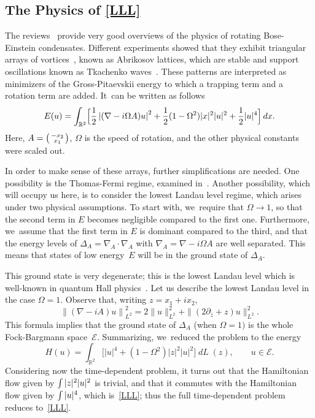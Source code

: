 \documentclass[10pt]{amsart}
\newenvironment{smallpmatrix}{\bigl(\begin{smallmatrix}}{\end{smallmatrix}\bigr)}
\DeclareMathOperator{\dL}{\mathit{dL}}
\theoremstyle{definition}
\let\dis\relax
\begin{document}
\subsection{The Physics of \eqref{LLL}}

The reviews~\cite{Aftalion,Fetter} provide very good overviews of the physics of rotating Bose-Einstein condensates.
Different experiments showed that they exhibit triangular arrays of vortices~\cite{ARVK,MCWD,SCEMC}, known as Abrikosov lattices, which are stable and support oscillations known as Tkachenko waves~\cite{BWCB}. These patterns are interpreted as minimizers of the Gross-Pitaevskii energy to which a trapping term and a rotation term are added. It~can be written as follows\vspace*{-1pt}\enlargethispage{3pt}
\[
E(u) = \int_{\mathbb{R}^2} \Bigl[ \frac{1}{2} \left| (\nabla - i \Omega A) u \right|^2 + \frac{1}{2}(1-\Omega^2) |x|^2 |u|^2 + \frac{1}{2} |u|^4 \Bigr] \,dx.
\]
Here, $A = \begin{smallpmatrix} -x_2 \\ x_1 \end{smallpmatrix}$, $\Omega$ is the speed of rotation, and the other physical constants were scaled out.

In order to make sense of these arrays, further simplifications are needed. One possibility is the Thomas-Fermi regime, examined in~\cite{FB}. Another possibility, which will occupy us here, is to consider the lowest Landau level regime, which arises under two physical assumptions. To start with, we~require that $\Omega \to 1$, so that the second term in $E$ becomes negligible compared to the first one. Furthermore, we~assume that the first term in $E$ is dominant compared to the third, and that the energy levels of $\Delta_A = \nabla_A \cdot \nabla_A$ with $\nabla_A=\nabla -i \Omega A$ are well separated. This means that states of low energy~$E$ will be in the ground state of $\Delta_A$.

This ground state is very degenerate; this is the lowest Landau level which is well-known in quantum Hall physics~\cite{GJ,PericeThese}. Let us describe the lowest Landau level in the case $\Omega = 1$. Observe that, writing $z=x_1+ix_2$,\vspace*{-3pt}
\[
\left\| (\nabla - i A) u \right\|^2_{L^2} = 2 \| u \|_{L^2}^2 + \| (2 \partial_{\overline{z}} + z) u \|_{L^2}^2.
\]
This formula implies that the ground state of $\Delta_A$ (when $\Omega=1)$ is the whole Fock-Bargmann space~$\mathcal{E}$. Summarizing, we~reduced the problem to the energy\vspace*{-3pt}
\[
H(u) = \int_{\mathbb{R}^2} \Big[ |u|^4 + (1-\Omega^2) |z|^2|u|^2 \Big]\dL(z), \qquad u \in \mathcal{E}.
\]
Considering now the time-dependent problem, it turns out that the Hamiltonian flow given by $\dis \int |z|^2|u|^2$ is trivial, and that it commutes with the Hamiltonian flow given by $\dis \int |u|^4$, which is~\eqref{LLL}; thus the full time-dependent problem reduces to~\eqref{LLL}.
\end{document}
